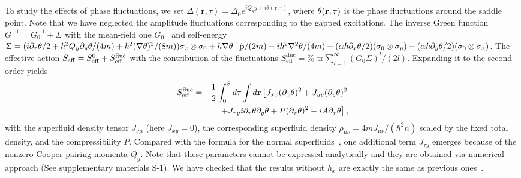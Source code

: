 \documentclass[prl,aps,twocolumn,showpacs, floatfix]{revtex4}
\begin{document}
To study the effects of phase fluctuations, we set $\Delta (\mathbf{r},\tau
)=\Delta _{0}e^{iQ_{y}y+i\theta (\mathbf{r},\tau )}$, where $\theta (\mathbf{%
r},\tau )$ is the phase fluctuations around the saddle point. Note that we
have neglected the amplitude fluctuations corresponding to the gapped
excitations. The inverse Green function $G^{-1}=G_{0}^{-1}+\Sigma $ with the
mean-field one $G_{0}^{-1}$ and self-energy $\Sigma =(i\partial _{\tau
}\theta /2+\hbar ^{2}Q_{y}\partial _{y}\theta /(4m)+\hbar ^{2}(\nabla \theta
)^{2}/(8m))\sigma _{z}\otimes \sigma _{0}+\hbar \nabla \theta \cdot \hat{%
\mathbf{p}}/(2m)-i\hbar ^{2}\nabla ^{2}\theta /(4m)+(\alpha \hbar \partial
_{x}\theta /2)(\sigma _{0}\otimes \sigma _{y})-(\alpha \hbar \partial
_{y}\theta /2)(\sigma _{0}\otimes \sigma _{x})$. The effective action $S_{%
\mathrm{eff}}=S_{\mathrm{eff}}^{0}+S_{\mathrm{eff}}^{\mathrm{fluc}}$ with
the contribution of the fluctuations $S_{\mathrm{eff}}^{\mathrm{fluc}}=\text{%
tr}\sum_{l=1}^{\infty }(G_{0}\Sigma )^{l}/(2l)$. Expanding it to the second
order yields
\begin{eqnarray}
S_{\mathrm{eff}}^{\mathrm{fluc}} =&&\frac{1}{2}\int_{0}^{\beta }d\tau \int d{%
\mathbf{r}}\left[ J_{xx}(\partial _{x}\theta )^{2}+J_{yy}(\partial
_{y}\theta )^{2}\right.  \notag \\
&&\left.+J_{\tau y}i\partial _{\tau }\theta \partial _{y}\theta +P(\partial
_{\tau }\theta )^{2}-iA\partial _{\tau }\theta \right] ,
\end{eqnarray}
with the superfluid density tensor $J_{\nu \mu }$ (here $J_{xy}=0$), the
corresponding superfluid density $\rho _{\mu \nu }=4mJ_{\mu \nu}/(\hbar
^{2}n) $ scaled by the fixed total density, and the compressibility $P$.
Compared with the formula for the normal superfluids~\cite{MingGongPRL}, one
additional term $J_{\tau y}$ emerges because of the nonzero Cooper pairing
momenta $Q_{y}$. Note that these parameters cannot be expressed analytically
and they are obtained via numerical approach (See supplementary materials
S-1). We have checked that the results without $h_{x}$ are exactly the same
as previous ones~\cite{MingGongPRL}.
\end{document}
